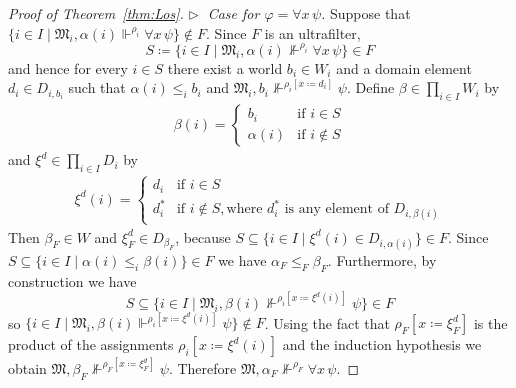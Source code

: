 \documentclass[10pt,a4paper]{amsart}
\newcommand{\mo}{\mathfrak}
\newcommand{\notsatisfy}[4]{#1, #2 \not\Vdash^{#4} #3}
\newcommand{\satisfySym}{\Vdash}
\newcommand{\satisfy}[4]{#1, #2 \satisfySym^{#4} #3}
\renewcommand{\phi}{\varphi}
\begin{document}
\begin{proof}[Proof of Theorem~\ref{thm:Los}]
  \medskip\noindent
  \textit{$\triangleright\;$ Case for $\phi = \forall x\,\psi$.}
    Suppose that
    $\{ i \in I \mid \satisfy{\mo{M}_i}{\alpha(i)}{\forall x\,\psi}{\rho_i} \} \notin F$. 
    Since $F$ is an ultrafilter, 
    \begin{equation*}
      S \coloneq \{ i \in I \mid \notsatisfy{\mo{M}_i}{\alpha(i)}{\forall x\,\psi}{\rho_i}\} \in F
    \end{equation*}
    and hence for every $i \in S$ there exist a world $b_i \in W_i$ and a domain
    element $d_i \in D_{i,b_i}$ such that $\alpha(i) \leq_i b_i$
    and $\notsatisfy{\mo{M}_i}{b_i}{\psi}{\rho_i[x \coloneq d_i]}$.
    Define $\beta \in \prod_{i \in I} W_i$ by
    \begin{align*}
      \beta(i)
        = \begin{cases}
            b_i &\text{if } i \in S \\
            \alpha(i) &\text{if } i \notin S
          \end{cases}
    \end{align*}
    and $\xi^d \in \prod_{i \in I} D_i$ by
    \begin{align*}
      \xi^d(i)
        = \begin{cases}
            d_i   &\text{if } i \in S \\
            d^*_i &\text{if } i \notin S, \text{where } d^*_i \text{ is any element of } D_{i,\beta(i)}
          \end{cases}
    \end{align*}
    Then $\beta_F \in W$ and $\xi^d_F \in D_{\beta_F}$, because
    $S \subseteq \{ i \in I \mid \xi^d(i) \in D_{i, \alpha(i)} \} \in F$.
%
    Since $S \subseteq \{ i \in I \mid \alpha(i) \leq_i \beta(i) \} \in F$
    we have $\alpha_F \leq_F \beta_F$.
    Furthermore, by construction we have 
    \begin{equation*}
      S \subseteq \{ i \in I \mid \notsatisfy{\mo{M}_i}{\beta(i)}{\psi}{\rho_i[x \coloneq \xi^d(i)]} \} \in F
    \end{equation*}
    so $\{ i \in I \mid \satisfy{\mo{M}_i}{\beta(i)}{\psi}{\rho_i[x \coloneq \xi^d(i)]} \} \not\in F$.
    Using the fact that $\rho_F[x \coloneq \xi^d_F]$ is the product of
    the assignments $\rho_i[x \coloneq \xi^d(i)]$ and the induction hypothesis
    we obtain $\notsatisfy{\mo{M}}{\beta_F}{\psi}{\rho_F[x \coloneq \xi^d_F]}$.
    Therefore $\notsatisfy{\mo{M}}{\alpha_F}{\forall x\, \psi}{\rho_F}$.


\end{proof}
\end{document}
